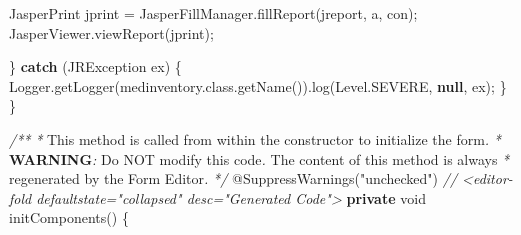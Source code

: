 \documentclass[
  10pt,
]{article}
\newenvironment{Shaded}{}{}
\newcommand{\AlertTok}[1]{\textcolor[rgb]{1.00,0.00,0.00}{\textbf{#1}}}
\newcommand{\AttributeTok}[1]{\textcolor[rgb]{0.49,0.56,0.16}{#1}}
\newcommand{\BuiltInTok}[1]{\textcolor[rgb]{0.00,0.50,0.00}{#1}}
\newcommand{\CommentTok}[1]{\textcolor[rgb]{0.38,0.63,0.69}{\textit{#1}}}
\newcommand{\ControlFlowTok}[1]{\textcolor[rgb]{0.00,0.44,0.13}{\textbf{#1}}}
\newcommand{\DataTypeTok}[1]{\textcolor[rgb]{0.56,0.13,0.00}{#1}}
\newcommand{\FunctionTok}[1]{\textcolor[rgb]{0.02,0.16,0.49}{#1}}
\newcommand{\KeywordTok}[1]{\textcolor[rgb]{0.00,0.44,0.13}{\textbf{#1}}}
\newcommand{\NormalTok}[1]{#1}
\newcommand{\OperatorTok}[1]{\textcolor[rgb]{0.40,0.40,0.40}{#1}}
\newcommand{\StringTok}[1]{\textcolor[rgb]{0.25,0.44,0.63}{#1}}
\begin{document}
\begin{Shaded}
\begin{Highlighting}[numbers=left,,]
\NormalTok{            JasperPrint jprint }\OperatorTok{=}\NormalTok{ JasperFillManager}\OperatorTok{.}\FunctionTok{fillReport}\OperatorTok{(}\NormalTok{jreport}\OperatorTok{,}\NormalTok{ a}\OperatorTok{,}\NormalTok{ con}\OperatorTok{);}
\NormalTok{            JasperViewer}\OperatorTok{.}\FunctionTok{viewReport}\OperatorTok{(}\NormalTok{jprint}\OperatorTok{);}
            
        \OperatorTok{\}} \ControlFlowTok{catch} \OperatorTok{(}\NormalTok{JRException ex}\OperatorTok{)} \OperatorTok{\{}
            \BuiltInTok{Logger}\OperatorTok{.}\FunctionTok{getLogger}\OperatorTok{(}\NormalTok{medinventory}\OperatorTok{.}\FunctionTok{class}\OperatorTok{.}\FunctionTok{getName}\OperatorTok{()).}\FunctionTok{log}\OperatorTok{(}\BuiltInTok{Level}\OperatorTok{.}\FunctionTok{SEVERE}\OperatorTok{,} \KeywordTok{null}\OperatorTok{,}\NormalTok{ ex}\OperatorTok{);}
        \OperatorTok{\}}
    \OperatorTok{\}}

    \CommentTok{/**}
     \CommentTok{*}\NormalTok{ This method is called from within the constructor to initialize the form}\CommentTok{.}
     \CommentTok{*} \AlertTok{WARNING}\CommentTok{:}\NormalTok{ Do NOT modify this code}\CommentTok{.}\NormalTok{ The content of this method is always}
     \CommentTok{*}\NormalTok{ regenerated by the Form Editor}\CommentTok{.}
     \CommentTok{*/}
    \AttributeTok{@SuppressWarnings}\OperatorTok{(}\StringTok{"unchecked"}\OperatorTok{)}
    \CommentTok{// \textless{}editor{-}fold defaultstate="collapsed" desc="Generated Code"\textgreater{}                          }
    \KeywordTok{private} \DataTypeTok{void} \FunctionTok{initComponents}\OperatorTok{()} \OperatorTok{\{}


\end{Highlighting}
\end{Shaded}
\end{document}
